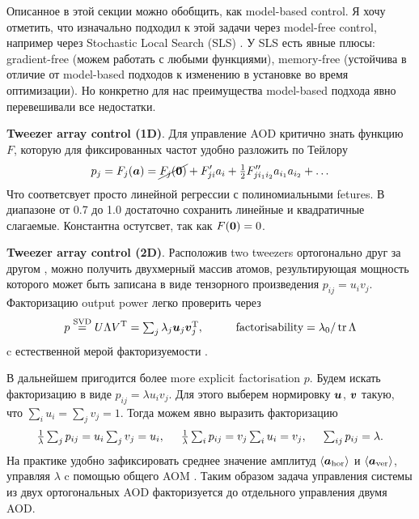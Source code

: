 
Описанное в этой секции можно обобщить, как model-based control. Я хочу отметить, что изначально подходил к этой задачи через model-free control, например через Stochastic Local Search (SLS) . У SLS есть явные плюсы: gradient-free (можем работать с любыми функциями), memory-free (устойчива в отличие от model-based подходов к изменению в установке во время оптимизации). Но конкретно для нас преимущества model-based подхода явно перевешивали все недостатки. 


\textbf{Tweezer array control (1D)}. Для управление AOD критично знать функцию $F$, которую для фиксированных частот удобно разложить по Тейлору
\begin{equation*}
	p_j = F_j(\boldsymbol{a}) = \cancel{F_j(\boldsymbol{0})} + F'_{ji} a_i  + \tfrac{1}{2} F''_{j i_1 i_2} a_{i_1} a_{i_2} + \ldots
\end{equation*}
Что соответсвует просто линейной регрессии  с полиномиальными fetures. В диапазоне  от 0.7 до 1.0 достаточно  сохранить линейные и квадратичные слагаемые. Константна остутсвет, так как $F(\boldsymbol{0}) = 0$. 



\textbf{Tweezer array control (2D)}. Расположив two tweezers ортогонально друг за другом , можно получить двухмерный массив атомов, результирующая мощность которого может быть записана в виде тензорного произведения $p_{ij} = u_i v_j$. Факторизацию output power легко проверить через
\begin{equation*}
	p \overset{\mathrm{SVD}}{=} U \Lambda V\T = \textstyle \sum_j \lambda_j \vc{u}_j \vc{v}_j\T,
	\hspace{10 mm} 
	\text{factorisability} = \lambda_0 / \tr \Lambda
\end{equation*}
c естественной мерой факторизуемости . 

В дальнейшем пригодится более more explicit factorisation $p$. Будем искать факторизацию в виде $p_{ij} = \lambda u_i v_j$. Для этого выберем нормировку $\boldsymbol{u}$, $\boldsymbol{v}$ такую, что $\sum_i u_i = \sum_j v_j = 1$. Тогда можем явно выразить факторизацию
\begin{equation}
	\textstyle
	\frac{1}{\lambda} \sum_j p_{ij} = u_i \sum_j v_j = u_i,
	\hspace{5 mm} 
	\frac{1}{\lambda} \sum_i p_{ij} = v_j \sum_i u_i = v_j,
	\hspace{5 mm} 
	\sum_{ij} p_{ij} = \lambda.
	\label{uv-decomposition}
\end{equation}
На практике удобно зафиксировать среднее значение амплитуд $\langle \boldsymbol{a}_{\textnormal{hor}} \rangle$ и $\langle \boldsymbol{a}_{\textnormal{ver}} \rangle$, управляя $\lambda$ c помощью общего AOM . Таким образом задача управления системы из двух ортогональных AOD факторизуется до отдельного управления двумя AOD.